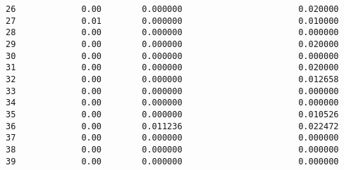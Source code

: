 \documentclass[11pt]{article}
\begin{document}
\begin{tcolorbox}[breakable, size=fbox, boxrule=.5pt, pad at break*=1mm, opacityfill=0]
\begin{Verbatim}[commandchars=\\\{\}]
26             0.00        0.000000                       0.020000
27             0.01        0.000000                       0.010000
28             0.00        0.000000                       0.000000
29             0.00        0.000000                       0.020000
30             0.00        0.000000                       0.000000
31             0.00        0.000000                       0.020000
32             0.00        0.000000                       0.012658
33             0.00        0.000000                       0.000000
34             0.00        0.000000                       0.000000
35             0.00        0.000000                       0.010526
36             0.00        0.011236                       0.022472
37             0.00        0.000000                       0.000000
38             0.00        0.000000                       0.000000
39             0.00        0.000000                       0.000000


\end{Verbatim}
\end{tcolorbox}
\end{document}
